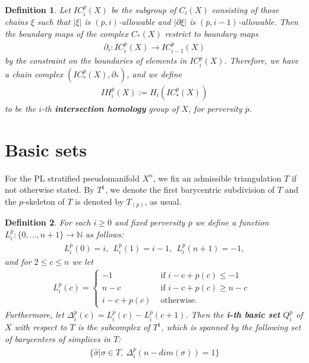 \documentclass[11pt]{book}
\newtheorem{definition}{Definition}
\begin{document}
\begin{definition}
Let $IC_i^{\overline{p}}(X)$ be the subgroup of $C_i(X)$ consisting of those chains $\xi$ such that $|\xi|$ is $(\overline{p},i)$-allowable and $|\partial \xi|$ is $(\overline{p},i-1)$-allowable. Then the boundary maps of the complex $C_*(X)$ restrict to boundary maps
\begin{align*}
\partial_i : IC_i^{\overline{p}}(X) \to IC_{i-1}^{\overline{p}}(X)
\end{align*}
by the constraint on the boundaries of elements in $IC_i^{\overline{p}}(X)$. Therefore, we have a chain complex $(IC_*^{\overline{p}}(X),\partial_*)$, and we define
\begin{align*}
IH_i^{\overline{p}}(X):=H_i(IC_*^{\overline{p}}(X))
\end{align*}
to be the $i$-th \textbf{intersection homology} group of $X$, for perversity $\overline{p}$.
\end{definition}

\section{Basic sets}

For the PL stratified pseudomanifold $X^n$, we fix an admissible triangulation $T$ if not otherwise stated. By $T^1$, we denote the first barycentric subdivision of $T$ and the $p$-skeleton of $T$ is denoted by $T_{(p)}$, as usual.

\begin{definition}
For each $i \geq 0$ and fixed perversity $\overline{p}$ we define a function $L_i^{\overline{p}}: \{ 0,...,n+1 \} \to \mathbb{N}$ as follows: 
\begin{align*}
L_i^{\overline{p}}(0)=i,\ \ L_i^{\overline{p}}(1)=i-1,\ \ L_i^{\overline{p}}(n+1)=-1,
\end{align*}
and for $2 \leq c \leq n$ we let
\begin{align*}
L_i^{\overline{p}}(c)=
\begin{cases}
-1 &\text{ if $i-c+p(c) \leq -1$}  \\
n-c &\text{ if $i-c+p(c) \geq n-c$ } \\
i-c+p(c) &\text{ otherwise.}
\end{cases}
\end{align*}
Furthermore, let $\Delta_i^{\overline{p}}(c)=L_i^{\overline{p}}(c) - L_i^{\overline{p}}(c+1)$. Then the \textbf{i-th basic set} $Q_i^{\overline{p}}$ of $X$ with respect to $T$ is the subcomplex of $T^1$, which is spanned by the following set of barycenters of simplices in $T$:
\begin{align*}
\{ \hat{\sigma} | \sigma \in T,\ \Delta_i^{\overline{p}}(n-dim(\sigma))=1\}
\end{align*}
\end{definition}
\end{document}
